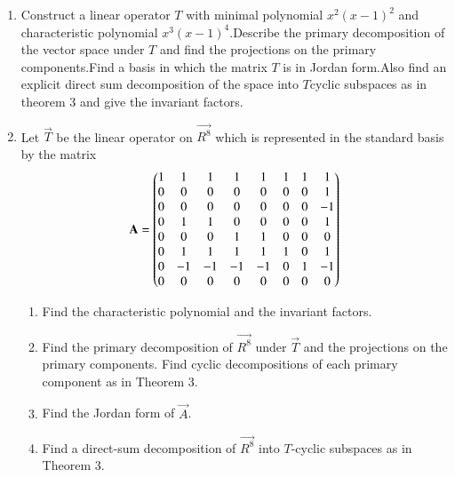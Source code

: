 \renewcommand{\theequation}{\theenumi}
\renewcommand{\thefigure}{\theenumi}
\begin{enumerate}[label=\thesubsection.\arabic*.,ref=\thesubsection.\theenumi]

\item Construct a linear operator $T$ with minimal polynomial $x^2(x-1)^2$ and characteristic polynomial $x^3(x-1)^4$.Describe the primary decomposition of the vector space under $T$ and find the projections on the primary components.Find a basis in which the matrix $T$ is in Jordan form.Also find an explicit direct sum decomposition of the space into $T$cyclic subspaces as in theorem 3 and give the invariant factors.
%
\\
\solution

\twocolumn
\item %
Let $\vec{T}$ be the linear operator on $\vec{R^8}$ which is represented in the standard basis by the matrix 
\begin{align}
    \mathbf{A}=\begin{pmatrix}
1 &1  &1  &1  &1  &1  &1  &1 \\ 
 0&0  &0  &0  &0  &0  &0  &1 \\ 
0 &0  &0  &0  &0  &0  &0  &-1 \\ 
0 &1  &1  &0  &0  &0  &0  &1 \\ 
0 &0  &0  &1  &1  &0  &0  &0 \\ 
0 &1  &1  &1  &1  &1  &0  &1 \\ 
0 &-1  &-1  &-1  &-1  &0  &1  &-1 \\ 
0 &0  &0  &0  &0  &0  &0  &0 \end{pmatrix}
\end{align}
\begin{enumerate}
    \item Find the characteristic polynomial and the invariant factors.
    \item Find the primary decomposition of $\vec{R^8}$ under $\vec{T}$ and the projections on the primary components. Find cyclic decompositions of each primary component as in Theorem 3. 
    \item Find the Jordan form of $\vec{A}$.
    \item Find a direct-sum decomposition of $\vec{R^8}$ into $T$-cyclic subspaces as in Theorem 3.  
\end{enumerate}
%
\solution



\end{enumerate}
